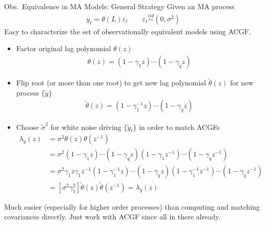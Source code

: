 \documentclass[aspectratio=169, handout]{beamer}
\newcommand{\iid}{\overset{iid}{\sim}}
\begin{document}
{\scriptsize
\begin{frame}{Obs.\ Equivalence in MA Models: General Strategy}
Given an MA process
\begin{align*}
  y_t = \theta(L)\varepsilon_t
  \qquad
  \varepsilon_t
  \iid
  (0,\sigma^2)
\end{align*}
Easy to characterize the set of observationally equivalent models using
ACGF.
\pause
\begin{itemize}
  \item Factor original lag polynomial $\theta(z)$
    \begin{align*}
      \theta(z) = (1-\gamma_1 z)\cdots(1-\gamma_q z)
    \end{align*}
  \pause
  \item
    \alert{Flip root} (or more than one root) to get new lag polynomial
    $\tilde{\theta}(z)$
    for new process $\{\tilde{y}\}$
    \begin{align*}
      \tilde{\theta}(z) = (1-\gamma_1^{-1} z)\cdots(1-\gamma_q z)
    \end{align*}
  \pause
  \item
    Choose $\tilde{\sigma}^2$ for white noise driving $\{\tilde{y}_t\}$
    in order to match ACGFs
    \begin{align*}
      \lambda_y(z)
      &= \sigma^2\theta(z)\theta(z^{-1})
      \\
      &=
      \sigma^2
      (1-\gamma_1 z)\cdots(1-\gamma_q z)
      (1-\gamma_1 z^{-1})\cdots(1-\gamma_q z^{-1})
      \\
      &=
      \sigma^2
      \gamma_1 z \gamma_1z^{-1}
      (1-\gamma_1^{-1} z)\cdots(1-\gamma_q z)
      (1-\gamma_1^{-1} z^{-1})\cdots(1-\gamma_q z^{-1})
      \\
      &=
      [\sigma^2 \gamma_1^2]
      \tilde{\theta}(z)\tilde{\theta}(z^{-1})
      =
      \lambda_{\tilde{y}}(z)
    \end{align*}
\end{itemize}
\pause
Much easier (especially for higher order processes)
than computing and matching covariances directly.
Just work with ACGF since all in there already.
\end{frame}
}
\end{document}
